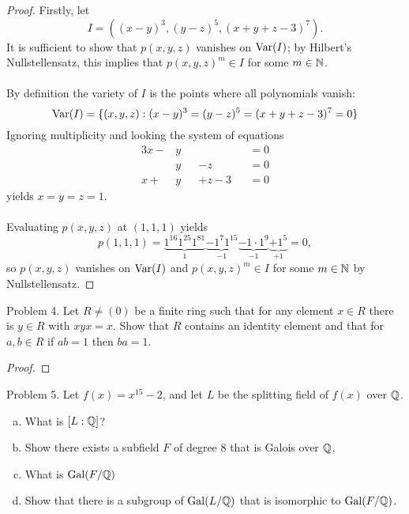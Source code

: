 \documentclass{article}
\begin{document}
\begin{proof}
  Firstly, let \[
    I = ((x - y)^3, (y - z)^5, (x + y + z - 3)^7).
  \] It is sufficient to show that $p(x,y,z)$ vanishes on $\operatorname{Var}(I)$; by
  Hilbert's Nullstellensatz,
  this implies that $p(x,y,z)^m \in I$ for some $m \in \mathbb N$.
  \\~\\
  By definition the variety of $I$ is the points where all polynomials vanish: \[
    \operatorname{Var}(I) = \{(x,y,z) : (x - y)^3 = (y - z)^5 = (x + y + z - 3)^7 = 0\}
  \]
  Ignoring multiplicity and looking the system of equations \begin{alignat*}{3}
    x - & y &&         && = 0 \\
        & y && - z     && = 0 \\
    x + & y && + z - 3 && = 0
  \end{alignat*} yields $x = y = z = 1$.
  \\~\\
  Evaluating $p(x,y,z)$ at $(1,1,1)$ yields \[
    p(1,1,1) =
      \underbrace{1^{16}1^{25}1^{81}}_1
      \underbrace{- 1^{7}1^{15}}_{-1}
      \underbrace{- 1\cdot1^{9}}_{-1}
      \underbrace{+ 1^5}_{+1} = 0,
  \] so $p(x,y,z)$ vanishes on $\operatorname{Var}(I)$ and
  $p(x,y,z)^m \in I$ for some $m \in \mathbb N$ by Nullstellensatz.
\end{proof}
\pagebreak

\begin{subsection}{Problem 4.}
  Let $R \neq (0)$ be a finite ring such that for any element $x \in R$ there is $y \in R$ with $xyx = x$. Show that $R$ contains an identity element and that for $a, b \in R$ if $ab = 1$ then $ba = 1$.
\end{subsection}

\begin{proof}
\end{proof}
\pagebreak

\begin{subsection}{Problem 5.}
  Let $f(x) = x^{15} - 2$, and let $L$ be the splitting field of $f(x)$ over $\mathbb Q$.
  \begin{enumerate}[(a)]
    \item What is $[L:\mathbb Q]$?
    \item Show there exists a subfield $F$ of degree $8$ that is Galois over $\mathbb Q$.
    \item What is $\operatorname{Gal}(F/\mathbb Q)$
    \item Show that there is a subgroup of $\operatorname{Gal}(L/\mathbb Q)$ that is isomorphic to $\operatorname{Gal}(F/\mathbb Q)$.
  \end{enumerate}
\end{subsection}
\end{document}
